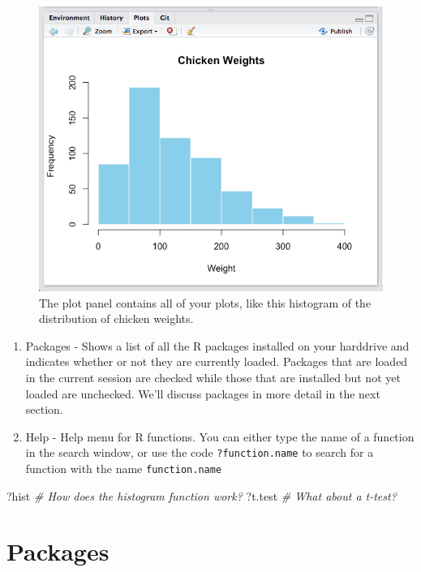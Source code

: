 \documentclass[]{book}
\newenvironment{Shaded}{\begin{snugshade}}{\end{snugshade}}
\newcommand{\CommentTok}[1]{\textcolor[rgb]{0.56,0.35,0.01}{\textit{{#1}}}}
\newcommand{\NormalTok}[1]{{#1}}
\theoremstyle{definition}
\theoremstyle{definition}
\theoremstyle{remark}
\begin{document}
\begin{figure}
\includegraphics[width=600px]{images/plotpanelss} \caption{The plot panel contains all of your plots, like this histogram of the distribution of chicken weights.}\label{fig:plotpanel}
\end{figure}

\begin{enumerate}
\def\labelenumi{\arabic{enumi}.}
\setcounter{enumi}{2}
\item
  Packages - Shows a list of all the R packages installed on your
  harddrive and indicates whether or not they are currently loaded.
  Packages that are loaded in the current session are checked while
  those that are installed but not yet loaded are unchecked. We'll
  discuss packages in more detail in the next section.
\item
  Help - Help menu for R functions. You can either type the name of a
  function in the search window, or use the code \texttt{?function.name}
  to search for a function with the name \texttt{function.name}
\end{enumerate}

\begin{Shaded}
\begin{Highlighting}[]
\NormalTok{?hist   }\CommentTok{# How does the histogram function work?}
\NormalTok{?t.test }\CommentTok{# What about a t-test?}
\end{Highlighting}
\end{Shaded}

\section{Packages}\label{packages}
\end{document}
